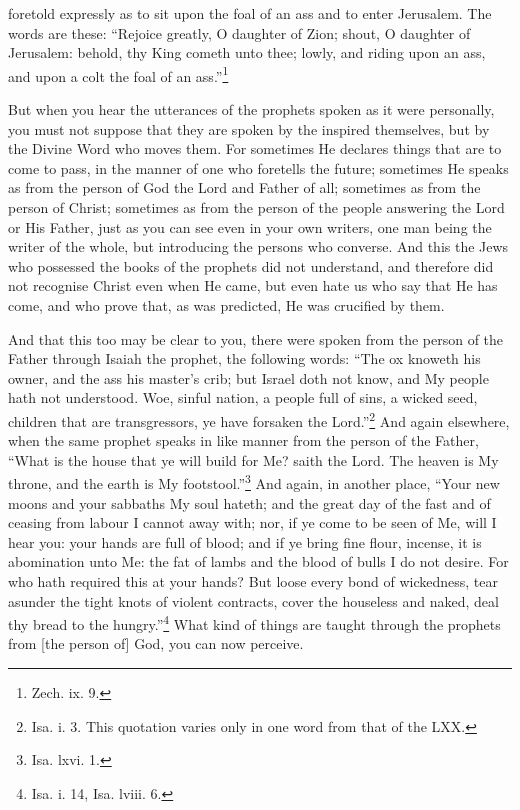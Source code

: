 foretold expressly as to sit upon the foal of an ass and to enter Jerusalem. The words are these: “Rejoice greatly, O daughter of Zion; shout, O daughter of Jerusalem: behold, thy King cometh unto thee; lowly, and riding upon an ass, and upon a colt the foal of an ass.”\footnote{Zech. ix. 9.}


But when you hear the utterances of the prophets spoken as it were personally, you must not suppose that they are spoken by the inspired themselves, but by the Divine Word who moves them. For sometimes He declares things that are to come to pass, in the manner of one who foretells the future; sometimes He speaks as from the person of God the Lord and Father of all; sometimes as from the person of Christ; sometimes as from the person of the people answering the Lord or His Father, just as you can see even in your own writers, one man being the writer of the whole, but introducing the persons who converse. And this the Jews who possessed the books of the prophets did not understand, and therefore did not recognise Christ even when He came, but even hate us who say that He has come, and who prove that, as was predicted, He was crucified by them.


And that this too may be clear to you, there were spoken from the person of the Father through Isaiah the prophet, the following words: “The ox knoweth his owner, and the ass his master’s crib; but Israel doth not know, and My people hath not understood. Woe, sinful nation, a people full of sins, a wicked seed, children that are transgressors, ye have forsaken the Lord.”\footnote{Isa. i. 3. This quotation varies only in one word from that of the LXX.} And again elsewhere, when the same prophet speaks in like manner from the person of the Father, “What is the house that ye will build for Me? saith the Lord. The heaven is My throne, and the earth is My footstool.”\footnote{Isa. lxvi. 1.} And again, in another place, “Your new moons and your sabbaths My soul hateth; and the great day of the fast and of ceasing from labour I cannot away with; nor, if ye come to be seen of Me, will I hear you: your hands are full of blood; and if ye bring fine flour, incense, it is abomination unto Me: the fat of lambs and the blood of bulls I do not desire. For who hath required this at your hands? But loose every bond of wickedness, tear asunder the tight knots of violent contracts, cover the houseless and naked, deal thy bread to the hungry.”\footnote{Isa. i. 14, Isa. lviii. 6.} What kind of things are taught through the prophets from [the person of] God, you can now perceive.

